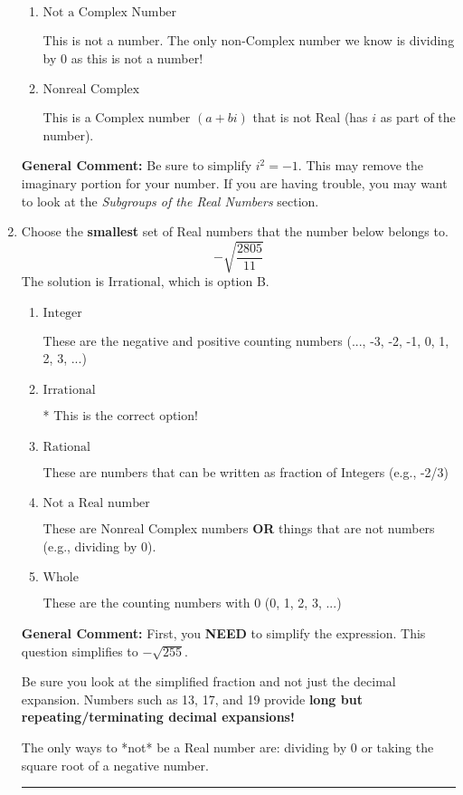 \documentclass{extbook}[14pt]
\newcommand{\litem}[1]{\item #1

\rule{\textwidth}{0.4pt}}
\begin{document}
\begin{enumerate}
{\begin{enumerate}[label=\Alph*.]
These are numbers that can be written as fraction of Integers (e.g., -2/3 + 5)
\item \( \text{Not a Complex Number} \)

This is not a number. The only non-Complex number we know is dividing by 0 as this is not a number!
\item \( \text{Nonreal Complex} \)

This is a Complex number $(a+bi)$ that is not Real (has $i$ as part of the number).
\end{enumerate}

\textbf{General Comment:} Be sure to simplify $i^2 = -1$. This may remove the imaginary portion for your number. If you are having trouble, you may want to look at the \textit{Subgroups of the Real Numbers} section.
}
\litem{
Choose the \textbf{smallest} set of Real numbers that the number below belongs to.
\[ -\sqrt{\frac{2805}{11}} \]
The solution is \( \text{Irrational} \), which is option B.\begin{enumerate}[label=\Alph*.]
\item \( \text{Integer} \)

These are the negative and positive counting numbers (..., -3, -2, -1, 0, 1, 2, 3, ...)
\item \( \text{Irrational} \)

* This is the correct option!
\item \( \text{Rational} \)

These are numbers that can be written as fraction of Integers (e.g., -2/3)
\item \( \text{Not a Real number} \)

These are Nonreal Complex numbers \textbf{OR} things that are not numbers (e.g., dividing by 0).
\item \( \text{Whole} \)

These are the counting numbers with 0 (0, 1, 2, 3, ...)
\end{enumerate}

\textbf{General Comment:} First, you \textbf{NEED} to simplify the expression. This question simplifies to $-\sqrt{255}$. 
 
 Be sure you look at the simplified fraction and not just the decimal expansion. Numbers such as 13, 17, and 19 provide \textbf{long but repeating/terminating decimal expansions!} 
 
 The only ways to *not* be a Real number are: dividing by 0 or taking the square root of a negative number. 
 
}
\end{enumerate}
\end{document}
